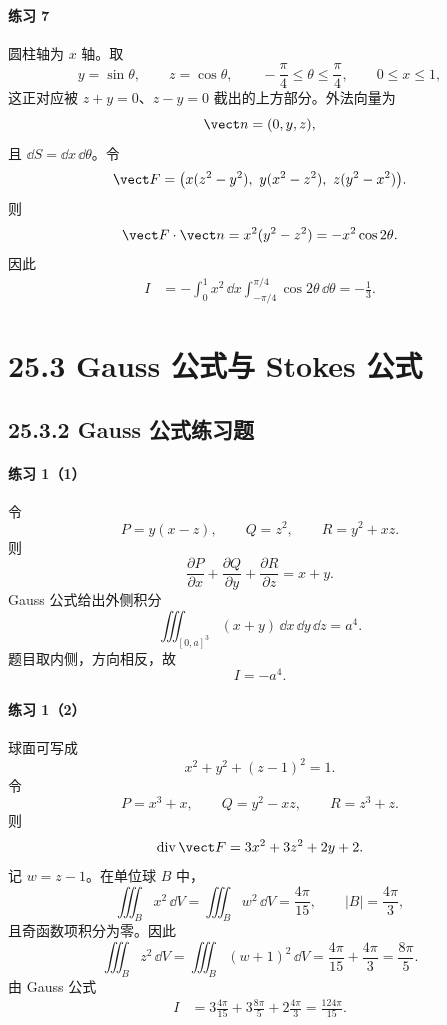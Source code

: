\paragraph{练习 7}
\begin{xsolution}
圆柱轴为 $x$ 轴。取
\[
  y=\sin\theta,\qquad z=\cos\theta,\qquad
  -\frac\pi4\le\theta\le\frac\pi4,\qquad0\le x\le1,
\]
这正对应被 $z+y=0$、$z-y=0$ 截出的上方部分。外法向量为
\[
  \vect n=(0,y,z),
\]
且 $\dd S=\dd x\,\dd\theta$。令
\[
\vect F=\bigl(x(z^2-y^2),\ y(x^2-z^2),\ z(y^2-x^2)\bigr).
\]
则
\[
  \vect F\cdot\vect n=x^2(y^2-z^2)=-x^2\cos2\theta.
\]
因此
\begin{align*}
I
&=-\int_0^1x^2\,\dd x\int_{-\pi/4}^{\pi/4}\cos2\theta\,\dd\theta
=-\frac13.
\end{align*}
\end{xsolution}

\section*{25.3 Gauss 公式与 Stokes 公式}

\subsection*{25.3.2 Gauss 公式练习题}

\paragraph{练习 1（1）}
\begin{xsolution}
令
\[
P=y(x-z),\qquad Q=z^2,
\qquad R=y^2+xz.
\]
则
\[
  \frac{\partial P}{\partial x}+\frac{\partial Q}{\partial y}+\frac{\partial R}{\partial z}=x+y.
\]
Gauss 公式给出外侧积分
\[
  \iiint_{[0,a]^3}(x+y)\,\dd x\,\dd y\,\dd z=a^4.
\]
题目取内侧，方向相反，故
\[
  \boxed{I=-a^4}.
\]
\end{xsolution}

\paragraph{练习 1（2）}
\begin{xsolution}
球面可写成
\[
  x^2+y^2+(z-1)^2=1.
\]
令
\[
P=x^3+x,\qquad Q=y^2-xz,\qquad R=z^3+z.
\]
则
\[
  \operatorname{div}\vect F=3x^2+3z^2+2y+2.
\]
记 $w=z-1$。在单位球 $B$ 中，
\[
  \iiint_Bx^2\,\dd V=\iiint_Bw^2\,\dd V=\frac{4\pi}{15},
  \qquad |B|=\frac{4\pi}{3},
\]
且奇函数项积分为零。因此
\[
  \iiint_Bz^2\,\dd V
  =\iiint_B(w+1)^2\,\dd V
  =\frac{4\pi}{15}+\frac{4\pi}{3}=\frac{8\pi}{5}.
\]
由 Gauss 公式
\begin{align*}
I
&=3\frac{4\pi}{15}+3\frac{8\pi}{5}+2\frac{4\pi}{3}
=\frac{124\pi}{15}.
\end{align*}
\end{xsolution}

